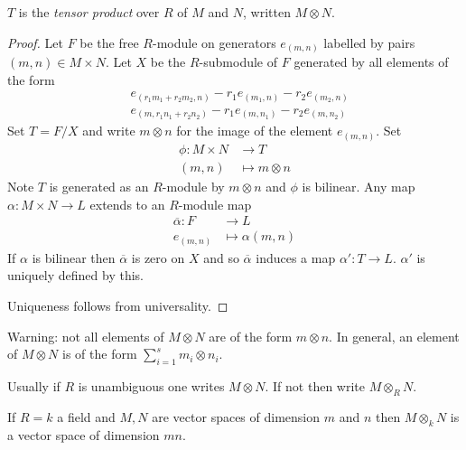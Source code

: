 \documentclass[a4paper]{article}
\begin{document}
\begin{definition}
  \(T\) is the \emph{tensor product} over \(R\) of \(M\) and \(N\), written \(M \otimes N\).
\end{definition}

\begin{proof}
  Let \(F\) be the free \(R\)-module on generators \(e_{(m, n)}\) labelled by pairs \((m, n) \in M \times N\). Let \(X\) be the \(R\)-submodule of \(F\) generated by all elements of the form
  \begin{align*}
    & e_{(r_1m_1 + r_2m_2, n)} - r_1 e_{(m_1, n)} - r_2 e_{(m_2, n)} \\
    & e_{(m, r_1n_1 + r_2n_2)} - r_1 e_{(m, n_1)} - r_2 e_{(m, n_2)}
  \end{align*}
  Set \(T = F/X\) and write \(m \otimes n\) for the image of the element \(e_{(m, n)}\). Set
  \begin{align*}
    \phi: M \times N &\to T \\
    (m, n) &\mapsto m \otimes n
  \end{align*}
  Note \(T\) is generated as an \(R\)-module by \(m \otimes n\) and \(\phi\) is bilinear. Any map \(\alpha: M \times N \to L\) extends to an \(R\)-module map
  \begin{align*}
    \overline \alpha: F &\to L \\
    e_{(m, n)} &\mapsto \alpha(m, n)
  \end{align*}
  If \(\alpha\) is bilinear then \(\overline \alpha\) is zero on \(X\) and so \(\overline \alpha\) induces a map \(\alpha': T \to L\). \(\alpha'\) is uniquely defined by this.

  Uniqueness follows from universality.
\end{proof}

Warning: not all elements of \(M \otimes N\) are of the form \(m \otimes n\). In general, an element of \(M \otimes N\) is of the form \(\sum_{i = 1}^s m_i \otimes n_i\).

Usually if \(R\) is unambiguous one writes \(M \otimes N\). If not then write \(M \otimes_R N\).

\begin{eg}
  If \(R = k\) a field and \(M, N\) are vector spaces of dimension \(m\) and \(n\) then \(M \otimes_k N\) is a vector space of dimension \(mn\).
\end{eg}
\end{document}
